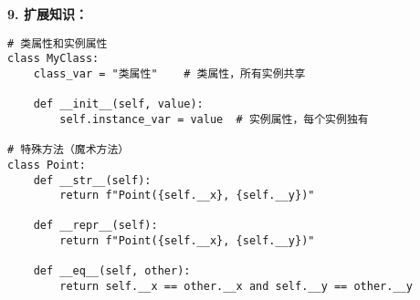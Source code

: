\begin{mdframed}
  \textbf{9. 扩展知识：}
  \begin{lstlisting}
# 类属性和实例属性
class MyClass:
    class_var = "类属性"    # 类属性，所有实例共享

    def __init__(self, value):
        self.instance_var = value  # 实例属性，每个实例独有

# 特殊方法（魔术方法）
class Point:
    def __str__(self):
        return f"Point({self.__x}, {self.__y})"

    def __repr__(self):
        return f"Point({self.__x}, {self.__y})"

    def __eq__(self, other):
        return self.__x == other.__x and self.__y == other.__y
  \end{lstlisting}

\end{mdframed}
